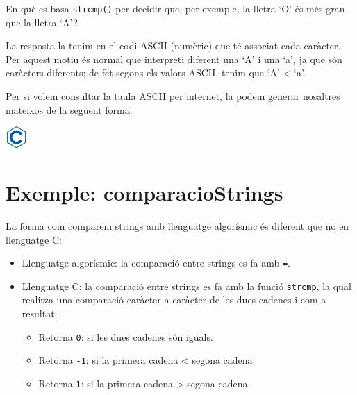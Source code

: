 \documentclass[]{book}
\newenvironment{Shaded}{\begin{snugshade}}{\end{snugshade}}
\newcommand{\DataTypeTok}[1]{\textcolor[rgb]{0.13,0.29,0.53}{#1}}
\newcommand{\DecValTok}[1]{\textcolor[rgb]{0.00,0.00,0.81}{#1}}
\newcommand{\SpecialCharTok}[1]{\textcolor[rgb]{0.00,0.00,0.00}{#1}}
\newcommand{\StringTok}[1]{\textcolor[rgb]{0.31,0.60,0.02}{#1}}
\newcommand{\ImportTok}[1]{#1}
\newcommand{\CommentTok}[1]{\textcolor[rgb]{0.56,0.35,0.01}{\textit{#1}}}
\newcommand{\ControlFlowTok}[1]{\textcolor[rgb]{0.13,0.29,0.53}{\textbf{#1}}}
\newcommand{\PreprocessorTok}[1]{\textcolor[rgb]{0.56,0.35,0.01}{\textit{#1}}}
\newcommand{\NormalTok}[1]{#1}
\providecommand{\tightlist}{%
  \setlength{\itemsep}{0pt}\setlength{\parskip}{0pt}}
\begin{document}
En què es basa \texttt{strcmp()} per decidir que, per exemple, la lletra
`O' és més gran que la lletra `A'?

La resposta la tenim en el codi ASCII (numèric) que té associat cada
caràcter. Per aquest motiu és normal que interpreti diferent una `A' i
una `a', ja que són caràcters diferents; de fet segons els valors ASCII,
tenim que `A' \textless{} `a'.

Per si volem consultar la taula ASCII per internet, la podem generar
nosaltres mateixos de la següent forma:

\includegraphics{./img/c.png}

\begin{Shaded}
\end{Shaded}

\section{Exemple: comparacioStrings}\label{exemple-comparaciostrings}

La forma com comparem strings amb llenguatge algorísmic és diferent que
no en llenguatge C:

\begin{itemize}
\tightlist
\item
  Llenguatge algorísmic: la comparació entre strings es fa amb
  \texttt{=}.
\item
  Llenguatge C: la comparació entre strings es fa amb la funció
  \texttt{strcmp}, la qual realitza una comparació caràcter a caràcter
  de les dues cadenes i com a resultat:

  \begin{itemize}
  \tightlist
  \item
    Retorna \texttt{0}: si les dues cadenes són iguals.
  \item
    Retorna \texttt{-1}: si la primera cadena \textless{} segona cadena.
  \item
    Retorna \texttt{1}: si la primera cadena \textgreater{} segona
    cadena.
  \end{itemize}
\end{itemize}
\end{document}
